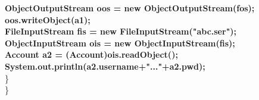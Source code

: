 \begin{flushleft}
\begin{itemize}
{				\s		\textbf{ObjectOutputStream oos = new ObjectOutputStream(fos);} \\
				\s \s		\textbf{oos.writeObject(a1);} \\
				\s		\textbf{FileInputStream fis = new  FileInputStream("abc.ser");} \\
				\s		\textbf{ObjectInputStream ois = new ObjectInputStream(fis);} \\
				\s \s	\textbf{Account a2 =  (Account)ois.readObject();} \\
				\s \s	\textbf{System.out.println(a2.username+"..."+a2.pwd);} \\
				\s	\} \\
				\}			
			}
			\bigskip
		\end{itemize}
\end{flushleft}
\newpage